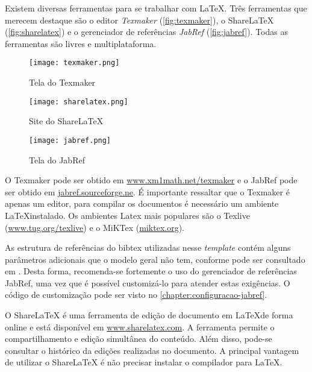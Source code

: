 Existem diversas ferramentas para se trabalhar com \LaTeX. Três ferramentas que merecem destaque são o editor \textit{Texmaker} (\autoref{fig:texmaker}), o ShareLaTeX (\autoref{fig:sharelatex}) e o gerenciador de referências \textit{JabRef} (\autoref{fig:jabref}). Todas as ferramentas são livres e multiplataforma. 

\begin{figure}[htb]
\caption{Tela do Texmaker}
 \label{fig:texmaker}
 \centering
 \texttt{[image: texmaker.png]}
 \fautor
\end{figure}

\begin{figure}[htb]
\caption{Site do ShareLaTeX}
 \label{fig:sharelatex}
 \centering
 \texttt{[image: sharelatex.png]}
 \fautor
\end{figure}

\begin{figure}[htb]
 \caption{Tela do JabRef}
 \label{fig:jabref}
 \centering
 \texttt{[image: jabref.png]}
\fautor
\end{figure}

O Texmaker pode ser obtido em \url{www.xm1math.net/texmaker} e o JabRef pode ser obtido em \url{jabref.sourceforge.ne}. É importante ressaltar que o Texmaker é apenas um editor, para compilar os documentos é necessário um ambiente \LaTeX instalado. Os ambientes Latex mais populares são o Texlive (\url{www.tug.org/texlive}) e o MiKTex (\url{miktex.org}). 

As estrutura de referências do bibtex utilizadas nesse \textit{template} contém alguns parâmetros adicionais que o modelo geral não tem, conforme pode ser consultado em . Desta forma, recomenda-se fortemente o uso do gerenciador de referências JabRef, uma vez que é possível customizá-lo para atender estas exigências. O código de customização pode ser visto no \autoref{chapter:configuracao-jabref}.

O ShareLaTeX é uma ferramenta de edição de documento em \LaTeX de forma online e está disponível em \url{www.sharelatex.com}. A ferramenta permite o compartilhamento e edição simultânea do conteúdo. Além disso, pode-se consultar o histórico da edições realizadas no documento. A principal vantagem de utilizar o ShareLaTeX é não precisar instalar o compilador para LaTeX.